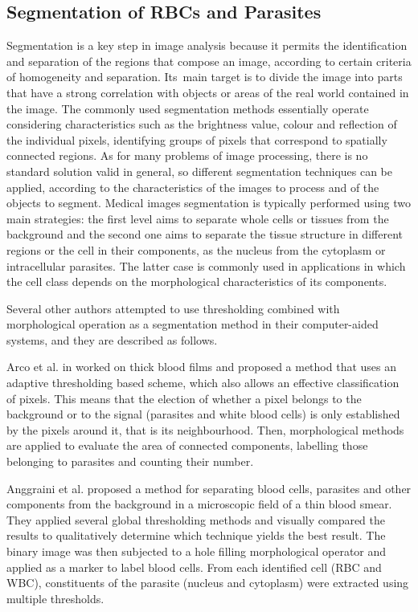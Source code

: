 \documentclass[sensors,review,accept,moreauthors,pdftex,10pt,a4paper]{mdpi}
\begin{document}
\subsection{Segmentation of RBCs and Parasites}
Segmentation is a key step in image analysis because it permits the identification and separation of the regions that compose an image, according to certain criteria of homogeneity and separation. Its~main target is to divide the image into parts that have a strong correlation with objects or areas of the real world contained in the image.
The commonly used segmentation methods essentially operate considering characteristics such as the brightness value, colour and reflection of the individual pixels, identifying groups of pixels that correspond to spatially connected regions. As for many problems of image processing, there is no standard solution valid in general, so different segmentation techniques can be applied, according to the characteristics of the images to process and of the objects to segment.
Medical images segmentation is typically performed using two main strategies: the first level aims to separate whole cells or tissues from the background and the second one aims to separate the tissue structure in different regions or the cell in their components, as the nucleus from the cytoplasm or intracellular parasites. The latter case is commonly used in applications in which the cell class depends on the morphological characteristics of its components.

Several other authors attempted to use thresholding combined with morphological operation as a segmentation method in their computer-aided systems, and they are described as follows.

Arco et al. in \cite{Arco2014} worked on thick blood films and proposed a method that uses an adaptive thresholding based scheme, which also allows an effective classification of pixels. This means that the election of whether a pixel belongs to the background or to the signal (parasites and white blood cells) is only established by the pixels around it, that is its neighbourhood. Then, morphological methods are applied to evaluate the area of connected components, labelling those belonging to parasites and counting their number.

Anggraini et al. \cite{Anggraini2011} proposed a method for separating blood cells, parasites and other components from the background in a microscopic field of a thin blood smear. They applied several global thresholding methods and visually compared the results to qualitatively determine which technique yields the best result. The binary image was then subjected to a hole filling morphological operator and applied as a marker to label blood cells. From each identified cell (RBC and WBC), constituents of the parasite (nucleus and cytoplasm) were extracted using multiple thresholds.
\end{document}
